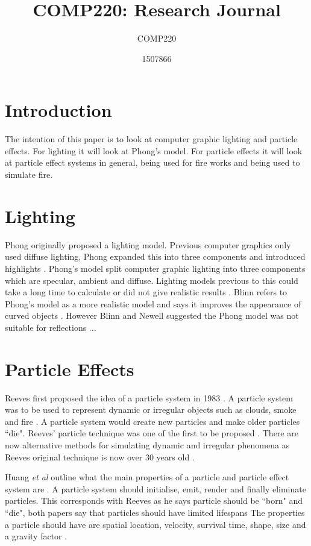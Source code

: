 \documentclass{scrartcl}
\title{COMP220: Research Journal}
\subtitle{COMP220}
\author{1507866}
\begin{document}
	
\maketitle
{}
	
\section{Introduction}
The intention of this paper is to look at computer graphic lighting and particle effects. For lighting it will look at Phong's model.
For particle effects it will look at particle effect systems in general, being used for fire works and being used to simulate fire.  

\section{Lighting}
Phong originally proposed a lighting model.  Previous computer graphics only used diffuse lighting, Phong expanded this into three components and introduced highlights \cite{Kajiya}. Phong's model split computer graphic lighting into three components which are specular, ambient and diffuse. Lighting models previous to this could take a long time to calculate or did not give realistic results \cite{Phong}.
Blinn refers to Phong's model as a more realistic model and says it improves the appearance of curved objects \cite{Blinn}. However Blinn and Newell suggested the Phong model was not suitable for reflections \cite{BlinnNewell}...

	
\section{Particle Effects}
Reeves first proposed the idea of a particle system in 1983 \cite{Reeves}. A particle system was to be used to represent dynamic or irregular objects such as clouds, smoke and fire \cite{Reeves, Lei, Nishita}. A particle system would create new particles and make older particles ``die". Reeves' particle technique was one of the first to be proposed \cite{Pegoraro}. There are now alternative methods for simulating dynamic and irregular phenomena as Reeves original technique is now over 30 years old \cite{Nishita, Pegoraro}.

Huang \textit{et al} outline what the main properties of a particle and particle effect system are \cite{Huang}.
A particle system should initialise, emit, render and finally eliminate particles. This corresponds with Reeves as he says particle should be ``born" and ``die", both papers say that particles should have limited lifespans
The properties a particle should have are spatial location, velocity, survival  time, shape, size and a gravity factor \cite{Huang}.
\end{document}
